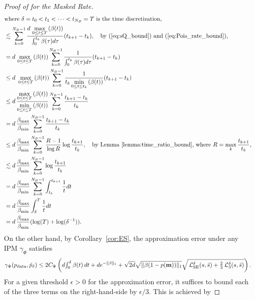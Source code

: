 \documentclass{article} %
\def\eqref#1{equation~\ref{#1}}
\newcommand{\bfm}{{\bf m}}
\newcommand{\LSE}{\mathcal{L}_{\mathrm{SE}}}
\renewcommand{\eqref}[1]{\textup{(\ref{#1})}}
\newcommand{\LThree}{\mathcal{L}_{3}}
\newcommand{\betamax}{\beta_{\mathrm{max}}}
\begin{document}
\begin{proof}[Proof of  for the Masked Rate]
\begin{align}
        \intertext{where $\delta =t_0 <t_1 < \cdots <t_{N_B}=T$ is the time discretization,}
        & \lesssim \sum_{k=0}^{N_B-1} \frac{d  \,\max\limits_{0\leq t \leq T}\left(\beta(t)\right)}{\int_0^{t_{k}} \beta(\tau) d\tau} (t_{k+1}-t_k), \quad \text{by~\eqref{eq:sQ_bound} and~\eqref{eq:Pois_rate_bound},} \nonumber\\
        &= d  \,\max\limits_{0\leq t \leq T}\left(\beta(t)\right) \sum_{k=0}^{N_B-1} \frac{1}{\int_0^{t_{k}} \beta(\tau) d\tau} (t_{k+1}-t_k) \nonumber\\ 
        & \leq d \, \,\max\limits_{0\leq t \leq T}\left(\beta(t)\right) \sum_{k=0}^{N_B-1} \frac{1}{t_{k} \min\limits_{0 \leq t \leq t_{k}} \left(\beta(t)\right) } (t_{k+1}-t_k) \nonumber\\
        & \leq d \, \frac{\max\limits_{0\leq t \leq T}\left(\beta(t)\right)}{\min\limits_{0\leq t \leq T}\left(\beta(t)\right)} \sum_{k=0}^{N_B-1} \frac{t_{k+1}-t_k}{t_{k}} \nonumber\\
        & = d \, \frac{\betamax}{\beta_{\mathrm{min}}} \sum_{k=0}^{N_B-1} \frac{t_{k+1}-t_k}{t_{k}} \nonumber\\
        & \leq d \, \frac{\betamax}{\beta_{\mathrm{min}}} \sum_{k=0}^{N_B-1}  \frac{R-1}{\log R} \log\frac{t_{k+1}}{t_k}, \quad \text{by Lemma~\ref{lemma:time_ratio_bound}, where $R=\max_k \frac{t_{k+1}}{t_k}$,}\nonumber\\
        & \lesssim d \, \frac{\betamax}{\beta_{\mathrm{min}}} \sum_{k=0}^{N_B-1} \log\frac{t_{k+1}}{t_k} \nonumber\\
        &= d \, \frac{\betamax}{\beta_{\mathrm{min}}}\sum_{k=0}^{N_B-1} \int_{t_k}^{t_{k+1}} \frac{1}{t} dt \nonumber\\
        &= d \,\frac{\betamax}{\beta_{\mathrm{min}}} \int_\delta^T \frac{1}{t} dt \nonumber\\
        &= d \,\frac{\betamax}{\beta_{\mathrm{min}}} (\log(T) + \log(\delta^{-1})). \label{eq:expected_step_masked}
    \end{align}
    On the other hand, by Corollary~\ref{cor:ES}, the approximation error under any IPM $\gamma_\Phi$ satisfies
    \[
     \gamma_\Psi(p_{\mathrm{data}}, \tilde{p}_\delta)  \leq 2 C_\Psi \left( d {\textstyle \int_0^\delta \beta(t)\,dt }+ d e^{-\| \beta \|_1}   +   \sqrt{2 d} \sqrt{\| \beta (1-p(\bfm))\|_1} \sqrt{ \,\LSE^\delta(s, \tilde{s}) + \tfrac{2}{3}\,\LThree^\delta(s, \tilde{s}) } \right).
    \]
    For a given threshold $\epsilon>0$ for the approximation error, it suffices to bound each of the three terms on the right-hand-side by $\epsilon/3$. This is achieved by

\end{proof}
\end{document}
